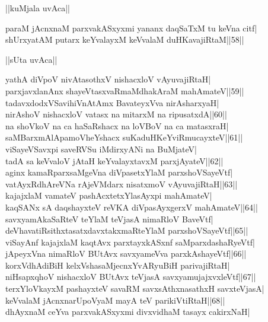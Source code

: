 \documentclass{article}
\begin{document}
\begin{center}
||kuMjala uvAca||
\end{center}

paraM jAcnxnaM parxvakASxyxmi yananx daqSaTxM tu keVna citf|\\
shUrxyatAM putarx keYvalayxM keVvalaM duHKavajiRtaM||58||\\

\begin{center}
||sUta uvAca||
\end{center}

yathA diVpoV nivAtasothxV nishacxloV vAyuvajiRtaH|\\
parxjavxlanAnx shayeVtasxvaRmaMdhakAraM mahAmateV||59||\\
tadavxdodxVSavihiVnAtAmx BavateyxVva nirAsharxyaH|\\
nirAshoV nishacxloV vatasx na mitarxM na ripusatxdA||60||\\
na shoVkoV na ca haSaRshacx na loVBoV na ca matasxraH|\\
saMBarxmAlApamoVheYshacx suKaduHKeYviRmucayxteV||61||\\
viSayeVSavxpi saveRVSu iMdirxyANi na BuMjateV|\\
tadA sa keVvaloV jAtaH keYvalayxtavxM parxjAyateV||62||\\
aginx kamaRparxsaMgeVna diVpasetxYlaM parxshoVSayeVtf|\\
vatAyxRdhAreVNa rAjeVMdarx nisatxmoV vAyuvajiRtaH||63||\\
kajajxlaM vamateV pashAcxtetxYlasAyxpi mahAmateV|\\
kaqSANx sA daqshayxteV reVKA diVpasAyxgerxV mahAmateV||64||\\
savxyamAkaSaRteV teYlaM teVjasA nimaRloV BaveVtf|\\
deVhavatiRsithxtasatxdavxtakxmaRteYlaM parxshoVSayeVtf||65||\\
viSayAnf kajajxlaM kaqtAvx parxtayxkASxnf saMparxdashaRyeVtf|\\
jApeyxVna nimaRloV BUtAvx savxyameVva parxkAshayeVtf||66||\\
korxVdhAdiBiH kelxVshasaMjecnxYvARyuBiH parivajiRtaH|\\
niHsapxqhoV nishacxloV BUtAvx teVjasA savxyamujajxvxleVtf||67||\\
terxYloVkayxM pashayxteV savaRM savxsAthxnasathxH savxteVjasA|\\
keVvalaM jAcnxnarUpoVyaM mayA teV parikiVtiRtaH||68||\\
dhAyxnaM ceYva parxvakASxyxmi divxvidhaM tasayx cakirxNaH|\\
\end{document}
